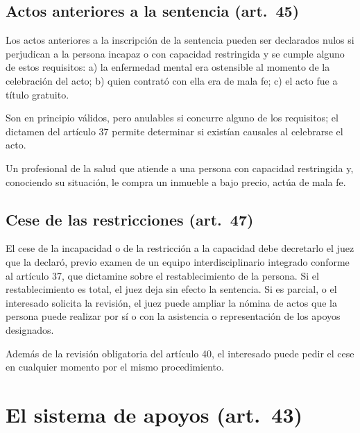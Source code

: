 \documentclass[12pt,oneside]{book}
\begin{document}
\subsection{Actos anteriores a la sentencia (art.~45)}

\begin{regla}
Los actos anteriores a la inscripción de la sentencia pueden ser declarados nulos si perjudican a la persona incapaz o con capacidad restringida y se cumple alguno de estos requisitos: a) la enfermedad mental era ostensible al momento de la celebración del acto; b) quien contrató con ella era de mala fe; c) el acto fue a título gratuito.
\end{regla}

Son en principio válidos, pero anulables si concurre alguno de los requisitos; el dictamen del artículo 37 permite determinar si existían causales al celebrarse el acto.

\begin{ejemplo}
Un profesional de la salud que atiende a una persona con capacidad restringida y, conociendo su situación, le compra un inmueble a bajo precio, actúa de mala fe.
\end{ejemplo}

\subsection{Cese de las restricciones (art.~47)}

\begin{regla}
El cese de la incapacidad o de la restricción a la capacidad debe decretarlo el juez que la declaró, previo examen de un equipo interdisciplinario integrado conforme al artículo 37, que dictamine sobre el restablecimiento de la persona. Si el restablecimiento es total, el juez deja sin efecto la sentencia. Si es parcial, o el interesado solicita la revisión, el juez puede ampliar la nómina de actos que la persona puede realizar por sí o con la asistencia o representación de los apoyos designados.
\end{regla}

Además de la revisión obligatoria del artículo 40, el interesado puede pedir el cese en cualquier momento por el mismo procedimiento.

\section{El sistema de apoyos (art.~43)}
\end{document}
